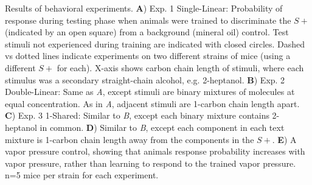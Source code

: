 \label{fig:results}
Results of behavioral experiments. \textbf{A}) Exp. 1 Single-Linear: Probability of response during testing phase when animals were trained to discriminate the $S+$ (indicated by an open square) from a background (mineral oil) control.  Test stimuli not experienced during training are indicated with closed circles.  Dashed vs dotted lines indicate experiments on two different strains of mice (using a different $S+$ for each).  X-axis shows carbon chain length of stimuli, where each stimulus was a secondary straight-chain alcohol, e.g. 2-heptanol.  \textbf{B})  Exp. 2 Double-Linear: Same as \textit{A}, except stimuli are binary mixtures of molecules at equal concentration.  As in \textit{A}, adjacent stimuli are 1-carbon chain length apart. \textbf{C}) Exp. 3 1-Shared: Similar to \textit{B}, except each binary mixture contains 2-heptanol in common. \textbf{D}) Similar to \textit{B}, except each component in each text mixture is 1-carbon chain length away from the components in the $S+$. \textbf{E}) A vapor pressure control, showing that animals response probability increases with vapor pressure, rather than learning to respond to the trained vapor pressure.  n=5 mice per strain for each experiment.  